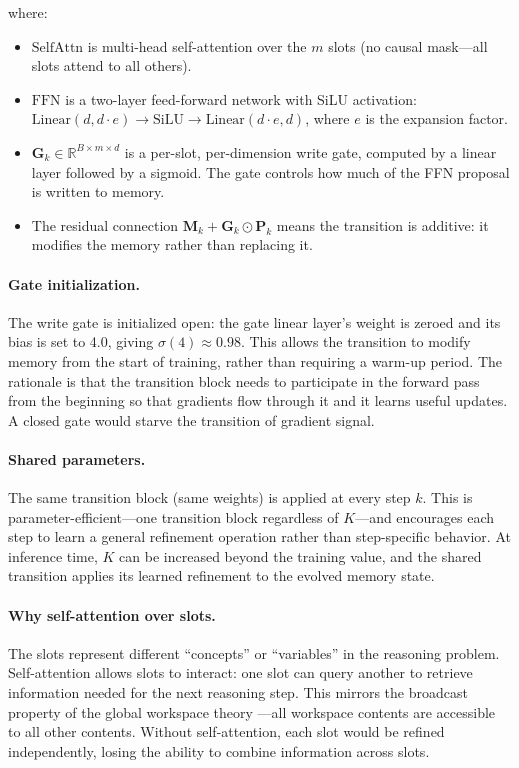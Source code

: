 \documentclass[11pt,a4paper]{article}
\newcommand{\R}{\mathbb{R}}
\begin{document}
where:
\begin{itemize}[nosep]
    \item $\text{SelfAttn}$ is multi-head self-attention over the $m$ slots (no causal mask---all slots attend to all others).
    \item $\text{FFN}$ is a two-layer feed-forward network with SiLU activation: $\text{Linear}(d, d \cdot e) \to \text{SiLU} \to \text{Linear}(d \cdot e, d)$, where $e$ is the expansion factor.
    \item $\mathbf{G}_k \in \R^{B \times m \times d}$ is a per-slot, per-dimension write gate, computed by a linear layer followed by a sigmoid. The gate controls how much of the FFN proposal is written to memory.
    \item The residual connection $\mathbf{M}_k + \mathbf{G}_k \odot \mathbf{P}_k$ means the transition is additive: it modifies the memory rather than replacing it.
\end{itemize}

\paragraph{Gate initialization.}
The write gate is initialized open: the gate linear layer's weight is zeroed and its bias is set to 4.0, giving $\sigma(4) \approx 0.98$. This allows the transition to modify memory from the start of training, rather than requiring a warm-up period. The rationale is that the transition block needs to participate in the forward pass from the beginning so that gradients flow through it and it learns useful updates. A closed gate would starve the transition of gradient signal.

\paragraph{Shared parameters.}
The same transition block (same weights) is applied at every step $k$. This is parameter-efficient---one transition block regardless of $K$---and encourages each step to learn a general refinement operation rather than step-specific behavior. At inference time, $K$ can be increased beyond the training value, and the shared transition applies its learned refinement to the evolved memory state.

\paragraph{Why self-attention over slots.}
The slots represent different ``concepts'' or ``variables'' in the reasoning problem. Self-attention allows slots to interact: one slot can query another to retrieve information needed for the next reasoning step. This mirrors the broadcast property of the global workspace theory \citep{baars2005global}---all workspace contents are accessible to all other contents. Without self-attention, each slot would be refined independently, losing the ability to combine information across slots.
\end{document}
